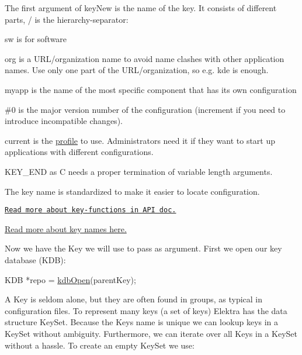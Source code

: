 \begin{DoxyItemize}
\item The first argument of {\ttfamily key\+New} is the name of the key. It consists of different parts, {\ttfamily /} is the hierarchy-\/separator\+:
\begin{DoxyItemize}
\item {\ttfamily sw} is for software
\item {\ttfamily org} is a U\+R\+L/organization name to avoid name clashes with other application names. Use only one part of the U\+R\+L/organization, so e.\+g. {\ttfamily kde} is enough.
\item {\ttfamily myapp} is the name of the most specific component that has its own configuration
\item {\ttfamily \#0} is the major version number of the configuration (increment if you need to introduce incompatible changes).
\item {\ttfamily current} is the \hyperlink{autotoc_md502_src_plugins_profile_README_md}{profile} to use. Administrators need it if they want to start up applications with different configurations.
\end{DoxyItemize}
\item {\ttfamily K\+E\+Y\+\_\+\+E\+ND} as C needs a proper termination of variable length arguments.
\end{DoxyItemize}

The key name is standardized to make it easier to locate configuration.


\begin{DoxyItemize}
\item \href{https://doc.libelektra.org/api/latest/html/group__key.html}{\tt Read more about key-\/functions in A\+PI doc.}
\item \hyperlink{doc_help_elektra-key-names_md}{Read more about key names here.}
\end{DoxyItemize}

Now we have the {\ttfamily Key} we will use to pass as argument. First we open our key database (K\+DB)\+:


\begin{DoxyCode}
KDB *repo = \hyperlink{group__kdb_ga6808defe5870f328dd17910aacbdc6ca}{kdbOpen}(parentKey);
\end{DoxyCode}


A {\ttfamily Key} is seldom alone, but they are often found in groups, as typical in configuration files. To represent many keys (a set of keys) Elektra has the data structure {\ttfamily Key\+Set}. Because the {\ttfamily Key}\textquotesingle{}s name is unique we can lookup keys in a {\ttfamily Key\+Set} without ambiguity. Furthermore, we can iterate over all {\ttfamily Key}s in a {\ttfamily Key\+Set} without a hassle. To create an empty {\ttfamily Key\+Set} we use\+:


